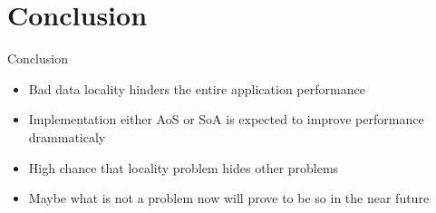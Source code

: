 \documentclass{beamer}
\begin{document}
\section{Conclusion}

\begin{frame}[fragile]
	
	\begin{block}{Conclusion}
		\begin{itemize}
			\item Bad data locality hinders the entire application performance
			\item Implementation either AoS or SoA is expected to improve performance drammaticaly 
			\item High chance that locality problem hides other problems
			\item Maybe what is not a problem now will prove to be so in the near future
		\end{itemize}
	\end{block}

\end{frame}
\end{document}
